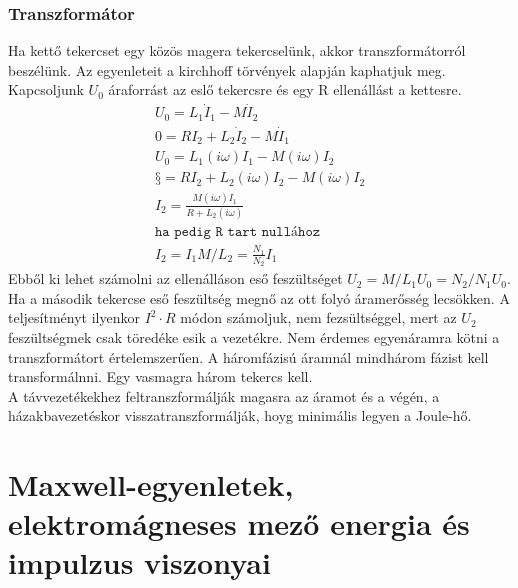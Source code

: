 \documentclass{article}
\begin{document}
\subsubsection{Transzformátor}
Ha kettő tekercset egy közös magera tekercselünk, akkor transzformátorról beszélünk. Az egyenleteit a kirchhoff törvények alapján kaphatjuk meg. Kapcsoljunk $U_0$ áraforrást az eslő tekercsre és egy R ellenállást a kettesre.
\begin{gather*}
U_0 = L_1 \dot{I}_1 - M \dot{I}_2 \\
0=RI_2 +L_2\dot{I}_2 - M\dot{I}_1 \\
U_0 = L_1(i\omega)I_1-M(i\omega) I_2 \\
§=RI_2 + L_2(i\omega) I_2 - M(i\omega) I_2 \\
I_2 = \frac{M(i\omega)I_1}{R+L_2 (i\omega)} \\ \texttt{ha pedig R tart nullához} \\
I_2 = I_1 M/L_2 = \frac{N_1}{N_2} I_1
\end{gather*}
Ebből ki lehet számolni az ellenálláson eső feszültséget $U_2 = M/L_1 U_0 = N_2/N_1 U_0$. Ha a második tekercse eső feszültség megnő az ott folyó áramerősség lecsökken. A teljesítményt ilyenkor $I^2 \cdot R$ módon számoljuk, nem fezsültséggel, mert az $U_2$ feszültségmek csak töredéke esik a vezetékre. Nem érdemes egyenáramra kötni a transzformátort értelemszerűen. A háromfázisú áramnál mindhárom fázist kell transformálnni. Egy vasmagra három tekercs kell. \\
A távvezetékekhez feltranszformálják magasra az áramot és a végén, a házakbavezetéskor visszatranszformálják, hoyg minimális legyen a Joule-hő.
\newpage
\section{Maxwell-egyenletek, elektromágneses mező energia és impulzus viszonyai}
\end{document}
